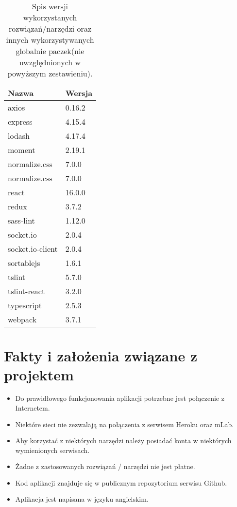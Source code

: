 \documentclass[eng,printmode]{mgr}
\begin{document}
\begin{table}[H]
\begin{tabularx}{\textwidth}{|X|X|}
   \hline
    \textbf{Nazwa} & \textbf{Wersja} \\
   \hline
      axios & 0.16.2 \\
   \hline
     express & 4.15.4 \\
   \hline
  	  lodash & 4.17.4 \\
   \hline
   	  moment & 2.19.1 \\
   \hline
   	 normalize.css & 7.0.0 \\
   \hline
   	 normalize.css & 7.0.0 \\
   \hline
   	 react & 16.0.0 \\
   \hline
   	 redux & 3.7.2 \\
   \hline
   	 sass-lint & 1.12.0 \\
   \hline
   	 socket.io & 2.0.4 \\
   \hline
   	  socket.io-client  & 2.0.4 \\
   \hline
      sortablejs & 1.6.1 \\
   \hline
     tslint & 5.7.0 \\
   \hline
      tslint-react & 3.2.0 \\
   \hline
      typescript & 2.5.3 \\
   \hline
     webpack & 3.7.1 \\
   \hline
\end{tabularx}
\caption{Spis wersji wykorzystanych rozwiązań/narzędzi oraz innych wykorzystywanych globalnie paczek(nie uwzględnionych w powyższym zestawieniu).}
\end{table}

\section{Fakty i założenia związane z projektem }
\begin{itemize}
  \item Do prawidłowego funkcjonowania aplikacji potrzebne jest połączenie z Internetem.
  \item Niektóre sieci nie zezwalają na połączenia z serwisem Heroku oraz mLab.
  \item Aby korzystać z niektórych narzędzi należy posiadać konta w niektórych wymienionych serwisach.
  \item Żadne z zastosowanych rozwiązań / narzędzi nie jest płatne.
  \item Kod aplikacji znajduje się w publicznym repozytorium serwisu Github.
  \item Aplikacja jest napisana w języku angielskim.
\end{itemize}
\end{document}
